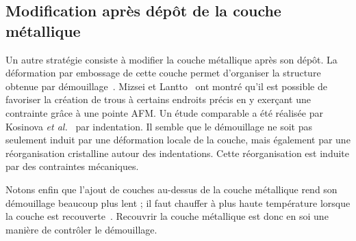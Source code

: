 	\subsection{Modification après dépôt de la couche métallique}
Un autre stratégie consiste à modifier la couche métallique après son dépôt. La déformation par embossage de cette couche permet d'organiser la structure obtenue par démouillage~\cite{yoshino2012effects}. Mizsei et Lantto~\cite{mizsei2001situ} ont montré qu'il est possible de favoriser la création de trous à certains endroits précis en y exerçant une contrainte grâce à une pointe AFM. Un étude comparable a été réalisée par Kosinova \textit{et al.}~\cite{kosinova2017indentation} par indentation. Il semble que le démouillage ne soit pas seulement induit par une déformation locale de la couche, mais également par une réorganisation cristalline autour des indentations. Cette réorganisation est induite par des contraintes mécaniques.\par 
Notons enfin que l'ajout de couches au-dessus de la couche métallique rend son démouillage beaucoup plus lent ; il faut chauffer à plus haute température lorsque la couche est recouverte~\cite{thompson2012solid}. Recouvrir la couche métallique est donc en soi une manière de contrôler le démouillage.\par 

